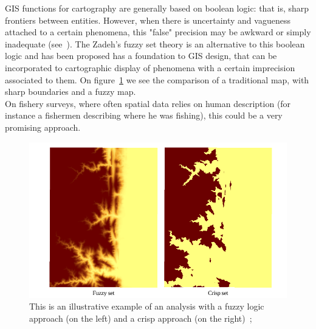 \documentclass[11pt]{article} %
\begin{document}
GIS functions for cartography are generally based on boolean logic: that is, sharp frontiers between entities. However, when there is uncertainty and vagueness attached to a certain phenomena, this "false" precision may be awkward or simply inadequate (see~\cite{fuzzy2}). The Zadeh’s fuzzy set theory is an alternative to this boolean logic and has been proposed has a foundation to GIS design, that can be incorporated to cartographic display of phenomena with a certain imprecision associated to them. On figure~\ref{fuzzy} we see the comparison of a traditional map, with sharp boundaries and a fuzzy map.\\
On fishery surveys, where often spatial data relies on human description (for instance a fishermen describing where he was fishing), this could be a very promising approach.

  \begin{figure}[!ht]%
    \begin{center} 
	\includegraphics[width=\textwidth]{fuzzy}
      \caption[This is an illustrative example of an analysis with a fuzzy logic approach (left) and a crisp approach (right);]
{This is an illustrative example of an analysis with a fuzzy logic approach (on the left) and a crisp approach (on the right)~\cite{fuzzy3};}
      \label{fuzzy} %
    \end{center} 
  \end{figure}

\clearpage
\end{document}
